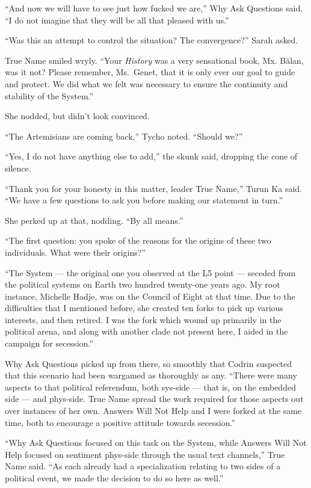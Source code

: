 ``And now we will have to see just how fucked we are,'' Why Ask Questions said. ``I do not imagine that they will be all that pleased with us.''

``Was this an attempt to control the situation? The convergence?'' Sarah asked.

True Name smiled wryly. ``Your \emph{History} was a very sensational book, Mx. Bălan, was it not? Please remember, Ms.~Genet, that it is only ever our goal to guide and protect. We did what we felt was necessary to ensure the continuity and stability of the System.''

She nodded, but didn't look convinced.

``The Artemisians are coming back,'' Tycho noted. ``Should we?''

``Yes, I do not have anything else to add,'' the skunk said, dropping the cone of silence.

``Thank you for your honesty in this matter, leader True Name,'' Turun Ka said. ``We have a few questions to ask you before making our statement in turn.''

She perked up at that, nodding. ``By all means.''

``The first question: you spoke of the reasons for the origins of these two individuals. What were their origins?''

``The System — the original one you observed at the L5 point — seceded from the political systems on Earth two hundred twenty-one years ago. My root instance, Michelle Hadje, was on the Council of Eight at that time. Due to the difficulties that I mentioned before, she created ten forks to pick up various interests, and then retired. I was the fork which wound up primarily in the political arena, and along with another clade not present here, I aided in the campaign for secession.''

Why Ask Questions picked up from there, so smoothly that Codrin suspected that this scenario had been wargamed as thoroughly as any. ``There were many aspects to that political referendum, both sys-side — that is, on the embedded side — and phys-side. True Name spread the work required for those aspects out over instances of her own. Answers Will Not Help and I were forked at the same time, both to encourage a positive attitude towards secession.''

``Why Ask Questions focused on this task on the System, while Answers Will Not Help focused on sentiment phys-side through the usual text channels,'' True Name said. ``As each already had a specialization relating to two sides of a political event, we made the decision to do so here as well.''

